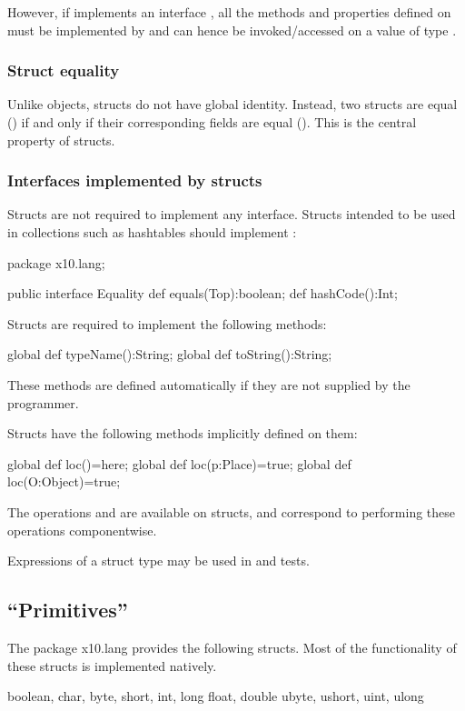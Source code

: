However,
if  implements an interface , all the methods and properties defined
on  must be implemented by  and can hence be invoked/accessed on a
value of type . 

\subsubsection{Struct equality}

Unlike objects, structs do not have global identity. Instead, two
structs are equal (\Xcd{==}) if and only if their corresponding fields are
equal (\Xcd{==}). This is the central property of structs.

\subsubsection{Interfaces implemented by structs}
Structs are not required to implement any interface. Structs intended
to be used in collections such as hashtables should implement
:
\begin{xten}
package x10.lang;  

public interface Equality {
    def equals(Top):boolean;
    def hashCode():Int;
}
\end{xten}
Structs are required to implement the following methods: 
\begin{xten}
  global def typeName():String;
  global def toString():String;  
\end{xten}
These methods are defined automatically if they are not supplied by the programmer.

Structs have the following methods implicitly defined on them:
\begin{xten}
  global def loc()=here;
  global def loc(p:Place)=true;
  global def loc(O:Object)=true;
\end{xten}

The operations \Xcd{==} and \Xcd{!=} are available on structs, and
correspond to performing these operations componentwise.

Expressions  of a struct type may be used in  and  tests.

\subsection{``Primitives''}

The package x10.lang provides the following structs. Most of the functionality of these structs is implemented natively. 
\begin{xten}
boolean, char, 
byte, short, int, long
float, double
ubyte, ushort, uint, ulong
\end{xten}
 
